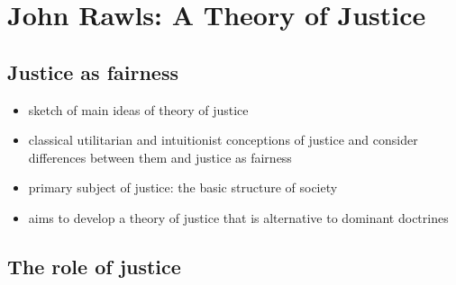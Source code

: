 \section{John Rawls: A Theory of Justice}

\subsection{Justice as fairness}

\begin{itemize}
	\item sketch of main ideas of theory of justice
	\item classical utilitarian and intuitionist conceptions of justice
	and consider differences between them and justice as fairness
	\item primary subject of justice: the basic structure of society
	\item aims to develop a theory of justice that is alternative to
	dominant doctrines
\end{itemize}

\subsection{The role of justice}

